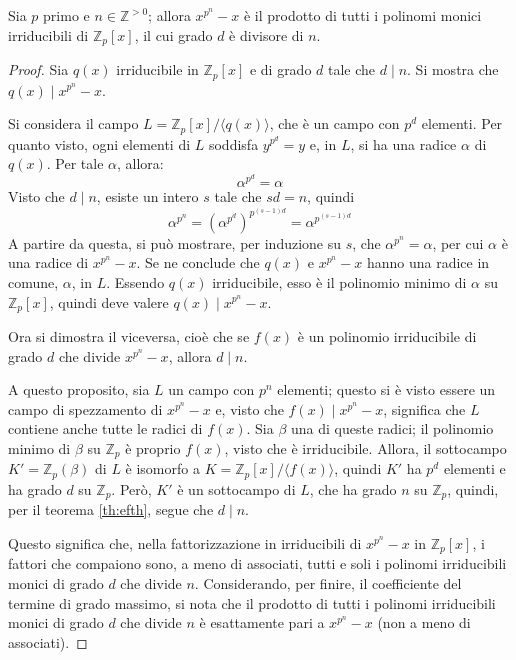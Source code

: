 \documentclass[11pt, a4paper]{scrartcl}
\theoremstyle{definition}
\numberwithin{esempio}{section}
\theoremstyle{definition}
\numberwithin{obs}{section}
\numberwithin{nota}{section}
\numberwithin{equation}{subsection}
\begin{document}
\begin{teorema}
	{}{}
	Sia $p$ primo e $n \in \mathbb{Z}^{>0} $; allora $x^{p^n} -x$ \`e il prodotto di tutti i polinomi monici irriducibili di $\mathbb{Z}_p[x]$, il cui grado $d$ \`e divisore di $n$.
	\begin{proof}
		Sia $q(x)$ irriducibile in $\mathbb{Z}_p[x]$ e di grado $d$ tale che $d  \mid n$.
		Si mostra che $q(x)  \mid x^{p^n} -x$.

		Si considera il campo $L = \mathbb{Z}_p[x] / \langle q(x) \rangle$, che \`e un campo con $p^d$ elementi.
		Per quanto visto, ogni elementi di $L$ soddisfa $y^{p^d} =y$ e, in $L$, si ha una radice $\alpha $ di $q(x)$.
		Per tale $\alpha $, allora:
		\[
		\alpha ^{p^d} = \alpha 
		\] 
		Visto che $d  \mid n$, esiste un intero $s$ tale che $sd = n$, quindi
		\[
		\alpha ^{p^n} = (\alpha ^{p^d} ) ^{p^{(s-1)d} } = \alpha ^{p^{(s-1)d} } 
		\] 
		A partire da questa, si pu\`o mostrare, per induzione su $s$, che $\alpha ^{p^n} =\alpha $, per cui $\alpha $ \`e una radice di $x^{p^n} -x$.
		Se ne conclude che $q(x)$ e $x^{p^n} -x$ hanno una radice in comune, $\alpha $, in $L$.
		Essendo $q(x)$ irriducibile, esso \`e il polinomio minimo di $\alpha $ su $\mathbb{Z}_p[x]$, quindi deve valere $q(x)  \mid x^{p^n} -x$.

		Ora si dimostra il viceversa, cio\`e che se $f(x)$ \`e un polinomio irriducibile di grado $d$ che divide $x^{p^n} -x$, allora $d  \mid  n$.

		A questo proposito, sia $L$ un campo con $p^n$ elementi; questo si \`e visto essere un campo di spezzamento di $x^{p^n} -x$ e, visto che $f(x)  \mid x^{p^n} -x$, significa che $L$ contiene anche tutte le radici di $f(x)$.
Sia $\beta $ una di queste radici; il polinomio minimo di $\beta $ su $\mathbb{Z}_p$ \`e proprio $f(x)$, visto che \`e irriducibile.
Allora, il sottocampo $K' = \mathbb{Z}_p(\beta )$ di $L$ \`e isomorfo a $K = \mathbb{Z}_p[x] / \langle f(x) \rangle$, quindi $K'$ ha $p^d$ elementi e ha grado $d$ su $\mathbb{Z}_p$.
Per\`o, $K'$ \`e un sottocampo di $L$, che ha grado $n$ su $\mathbb{Z}_p$, quindi, per il teorema \ref{th:efth}, segue che $d  \mid n$.

Questo significa che, nella fattorizzazione in irriducibili di $x^{p^n} -x$ in $\mathbb{Z}_p[x]$, i fattori che compaiono sono, a meno di associati, tutti e soli i polinomi irriducibili monici di grado $d$ che divide $n$.
Considerando, per finire, il coefficiente del termine di grado massimo, si nota che il prodotto di tutti i polinomi irriducibili monici di grado $d$ che divide $n$ \`e esattamente pari a $x^{p^n} -x$ (non a meno di associati).
	\end{proof}
\end{teorema}
\end{document}
